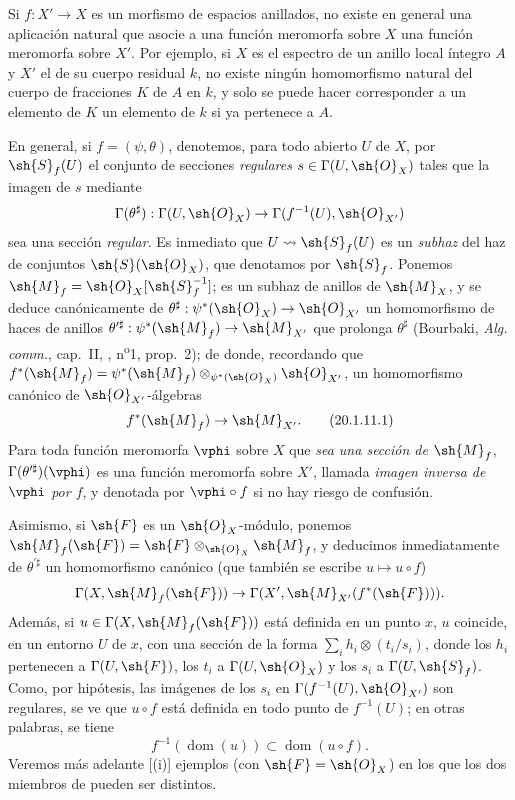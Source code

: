 \begin{env}[20.1.11]
\label{IV.20.1.11}
Si $f:X'\to X$ es un morfismo de espacios anillados, no existe en general una aplicación natural que asocie a una función meromorfa sobre $X$ una función meromorfa sobre $X'$.
Por ejemplo, si $X$ es el espectro de un anillo local íntegro $A$ y $X'$ el de su cuerpo residual $k$, no existe ningún homomorfismo natural del cuerpo de fracciones $K$ de $A$ en $k$, y solo se puede hacer corresponder a un elemento de $K$ un elemento de $k$ si ya pertenece a $A$.

En general, si $f=(\psi,\theta)$, denotemos, para todo abierto $U$ de $X$, por $\sh{S}_f(U)$ el conjunto de secciones \emph{regulares} $s\in\Gamma(U,\sh{O}_X)$ tales que la imagen de $s$ mediante
\[
  \Gamma(\theta^\sharp):\Gamma(U,\sh{O}_X)\to\Gamma(f^{-1}(U),\sh{O}_{X'})
\]
sea una sección \emph{regular}.
Es inmediato que $U\leadsto\sh{S}_f(U)$ es un \emph{subhaz} del haz de conjuntos $\sh{S}(\sh{O}_X)$, que denotamos por $\sh{S}_f$.
Ponemos $\sh{M}_f=\sh{O}_X[\sh{S}_f^{-1}]$; es un subhaz
de anillos de $\sh{M}_X$, y se deduce canónicamente de $\theta^\sharp:\psi^*(\sh{O}_X)\to\sh{O}_{X'}$ un homomorfismo de haces de anillos $\theta^{\prime\sharp}:\psi^*(\sh{M}_f)\to\sh{M}_{X'}$ que prolonga $\theta^\sharp$ (Bourbaki, \emph{Alg. comm.}, cap.~II, , n\textsuperscript{o}1, prop.~2); de donde, recordando que $f^*(\sh{M}_f)=\psi^*(\sh{M}_f)\otimes_{\psi^*(\sh{O}_X)}\sh{O}_{X'}$, un homomorfismo canónico de $\sh{O}_{X'}$-álgebras
\[
\label{IV.20.1.11.1}
  f^*(\sh{M}_f)\to\sh{M}_{X'}.
  \tag{20.1.11.1}
\]
Para toda función meromorfa $\vphi$ sobre $X$ que \emph{sea una sección de $\sh{M}_f$}, $\Gamma(\theta^{\prime\sharp})(\vphi)$ es una función meromorfa sobre $X'$, llamada \emph{imagen inversa de $\vphi$ por $f$}, y denotada por $\vphi\circ f$ si no hay riesgo de confusión.

Asimismo, si $\sh{F}$ es un $\sh{O}_X$-módulo, ponemos $\sh{M}_f(\sh{F})=\sh{F}\otimes_{\sh{O}_X}\sh{M}_f$, y deducimos inmediatamente de $\theta^{\prime\sharp}$ un homomorfismo canónico (que también se escribe $u\mapsto u\circ f$)
\[
  \Gamma(X,\sh{M}_f(\sh{F}))\to\Gamma(X',\sh{M}_{X'}(f^*(\sh{F}))).
\]
Además, si $u\in\Gamma(X,\sh{M}_f(\sh{F}))$ está definida  en un punto $x$, $u$ coincide, en un entorno $U$ de $x$, con una sección de la forma $\sum_i h_i\otimes(t_i/s_i)$, donde los $h_i$ pertenecen a $\Gamma(U,\sh{F})$, los $t_i$ a $\Gamma(U,\sh{O}_X)$ y los $s_i$ a $\Gamma(U,\sh{S}_f)$.
Como, por hipótesis, las imágenes de los $s_i$ en $\Gamma(f^{-1}(U),\sh{O}_{X'})$ son regulares, se ve que $u\circ f$ está definida en todo punto de $f^{-1}(U)$; en otras palabras, se tiene
\[
\label{IV.20.1.11.2}
  f^{-1}(\operatorname{dom}(u))\subset\operatorname{dom}(u\circ f).
  \tag{20.1.11.2}
\]
Veremos más adelante [(i)] ejemplos (con $\sh{F}=\sh{O}_X$) en los que los dos miembros de  pueden ser distintos.


\end{env}
